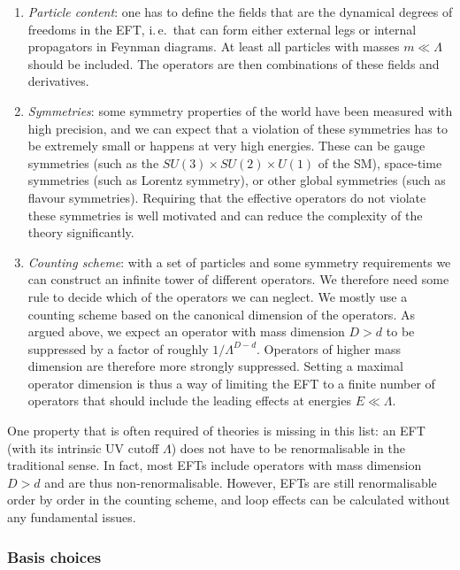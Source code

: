 \begin{enumerate}
\item \emph{Particle content}: one has to define the fields that are
  the dynamical degrees of freedoms in the EFT, i.\,e.\ that can form
  either external legs or internal propagators in Feynman diagrams. At
  least all particles with masses $m \ll \Lambda$ should be
  included. The operators are then combinations of these fields and
  derivatives.
%
\item \emph{Symmetries}: some symmetry properties of the world have
  been measured with high precision, and we can expect that a
  violation of these symmetries has to be extremely small or happens
  at very high energies. These can be gauge symmetries (such as the
  $SU(3) \times SU(2) \times U(1)$ of the SM), space-time symmetries
  (such as Lorentz symmetry), or other global symmetries (such as
  flavour symmetries). Requiring that the effective operators do not
  violate these symmetries is well motivated and can reduce the
  complexity of the theory significantly.
%
\item \emph{Counting scheme}: with a set of particles and some
  symmetry requirements we can construct an infinite tower of
  different operators. We therefore need some rule to decide which of
  the operators we can neglect. We mostly use a counting scheme based
  on the canonical dimension of the operators. As argued above, we
  expect an operator with mass dimension $D > d$ to be suppressed by a
  factor of roughly $1 / \Lambda^{D-d}$. Operators of higher mass
  dimension are therefore more strongly suppressed. Setting a maximal
  operator dimension is thus a way of limiting the EFT to a finite
  number of operators that should include the leading effects at
  energies $E \ll \Lambda$.
\end{enumerate}

One property that is often required of theories is missing in this
list: an EFT (with its intrinsic UV cutoff $\Lambda$) does not have to
be renormalisable in the traditional sense. In fact, most EFTs include
operators with mass dimension $D > d$ and are thus non-renormalisable.
However, EFTs are still renormalisable order by order in the counting
scheme, and loop effects can be calculated without any fundamental
issues. 



\subsubsection{Basis choices}


